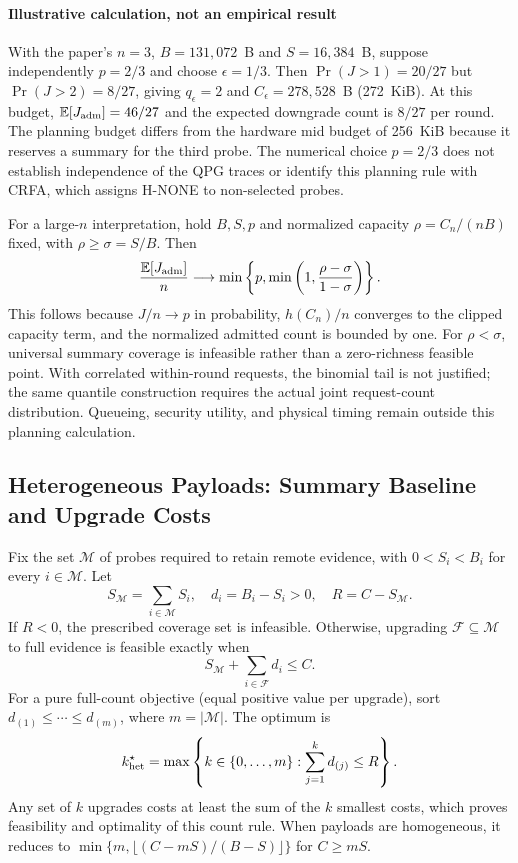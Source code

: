 \documentclass[10pt,onecolumn]{IEEEtran}
\begin{document}
\paragraph{Illustrative calculation, not an empirical result}
With the paper's $n=3$, $B=131{,}072$~B and $S=16{,}384$~B, suppose
independently $p=2/3$ and choose $\epsilon=1/3$. Then
$\Pr(J>1)=20/27$ but $\Pr(J>2)=8/27$, giving $q_\epsilon=2$ and
$C_\epsilon=278{,}528$~B (272~KiB). At this budget,
$\mathbb E[J_{\rm adm}]=46/27$ and the expected downgrade count is $8/27$
per round. The planning budget differs from the hardware mid budget of
256~KiB because it reserves a summary for the third probe. The numerical
choice $p=2/3$ does not establish independence of the QPG traces or identify
this planning rule with CRFA, which assigns H-NONE to non-selected probes.

For a large-$n$ interpretation, hold $B,S,p$ and normalized capacity
$\rho=C_n/(nB)$ fixed, with $\rho\geq\sigma=S/B$. Then
\begin{equation}
\frac{\mathbb E[J_{\rm adm}]}{n}
\longrightarrow
\min\left\{p,\min\left(1,\frac{\rho-\sigma}{1-\sigma}\right)\right\}.
\label{eq:supp_large_n}
\end{equation}
This follows because $J/n\to p$ in probability, $h(C_n)/n$ converges to the
clipped capacity term, and the normalized admitted count is bounded by one.
For $\rho<\sigma$, universal summary coverage is infeasible rather than a
zero-richness feasible point. With correlated within-round requests, the
binomial tail is not justified; the same quantile construction requires the
actual joint request-count distribution. Queueing, security utility, and
physical timing remain outside this planning calculation.

\subsection{Heterogeneous Payloads: Summary Baseline and Upgrade Costs}
\label{sec:supp_heterogeneous}
Fix the set $\mathcal M$ of probes required to retain remote evidence, with
$0<S_i<B_i$ for every $i\in\mathcal M$. Let
\begin{equation}
S_{\mathcal M}=\sum_{i\in\mathcal M}S_i,\quad
d_i=B_i-S_i>0,\quad R=C-S_{\mathcal M}.
\label{eq:supp_hetero_baseline}
\end{equation}
If $R<0$, the prescribed coverage set is infeasible. Otherwise, upgrading
$\mathcal F\subseteq\mathcal M$ to full evidence is feasible exactly when
\begin{equation}
S_{\mathcal M}+\sum_{i\in\mathcal F}d_i\leq C.
\label{eq:supp_hetero_constraint}
\end{equation}
For a pure full-count objective (equal positive value per upgrade), sort
$d_{(1)}\leq\cdots\leq d_{(m)}$, where $m=|\mathcal M|$. The optimum is
\begin{equation}
k_{\rm het}^{\star}
=\max\left\{k\in\{0,\ldots,m\}:\sum_{j=1}^{k}d_{(j)}\leq R\right\}.
\label{eq:supp_hetero_count}
\end{equation}
Any set of $k$ upgrades costs at least the sum of the $k$ smallest costs,
which proves feasibility and optimality of this count rule. When payloads
are homogeneous, it reduces to
$\min\{m,\lfloor(C-mS)/(B-S)\rfloor\}$ for $C\geq mS$.
\end{document}
